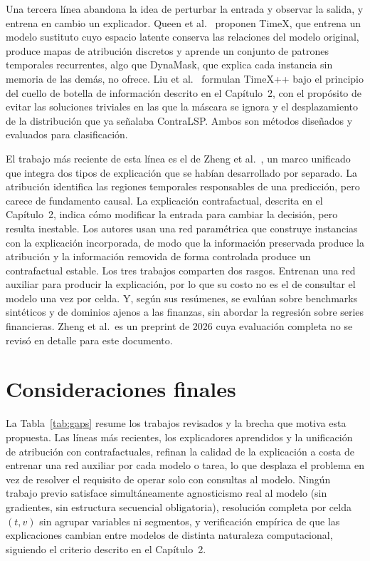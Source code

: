 Una tercera línea abandona la idea de perturbar la entrada y observar la salida, y entrena en cambio un explicador. Queen et al.\ \cite{queen2023timex} proponen TimeX, que entrena un modelo sustituto cuyo espacio latente conserva las relaciones del modelo original, produce mapas de atribución discretos y aprende un conjunto de patrones temporales recurrentes, algo que DynaMask, que explica cada instancia sin memoria de las demás, no ofrece. Liu et al.\ \cite{liu2024timexpp} formulan TimeX++ bajo el principio del cuello de botella de información descrito en el Capítulo~2, con el propósito de evitar las soluciones triviales en las que la máscara se ignora y el desplazamiento de la distribución que ya señalaba ContraLSP. Ambos son métodos diseñados y evaluados para clasificación.

El trabajo más reciente de esta línea es el de Zheng et al.\ \cite{zheng2026unifiedib}, un marco unificado que integra dos tipos de explicación que se habían desarrollado por separado. La atribución identifica las regiones temporales responsables de una predicción, pero carece de fundamento causal. La explicación contrafactual, descrita en el Capítulo~2, indica cómo modificar la entrada para cambiar la decisión, pero resulta inestable. Los autores usan una red paramétrica que construye instancias con la explicación incorporada, de modo que la información preservada produce la atribución y la información removida de forma controlada produce un contrafactual estable. Los tres trabajos comparten dos rasgos. Entrenan una red auxiliar para producir la explicación, por lo que su costo no es el de consultar el modelo una vez por celda. Y, según sus resúmenes, se evalúan sobre benchmarks sintéticos y de dominios ajenos a las finanzas, sin abordar la regresión sobre series financieras. Zheng et al.\ es un preprint de 2026 cuya evaluación completa no se revisó en detalle para este documento.

\section{Consideraciones finales}

La Tabla~\ref{tab:gaps} resume los trabajos revisados y la brecha que motiva esta propuesta. Las líneas más recientes, los explicadores aprendidos y la unificación de atribución con contrafactuales, refinan la calidad de la explicación a costa de entrenar una red auxiliar por cada modelo o tarea, lo que desplaza el problema en vez de resolver el requisito de operar solo con consultas al modelo. Ningún trabajo previo satisface simultáneamente agnosticismo real al modelo (sin gradientes, sin estructura secuencial obligatoria), resolución completa por celda $(t,v)$ sin agrupar variables ni segmentos, y verificación empírica de que las explicaciones cambian entre modelos de distinta naturaleza computacional, siguiendo el criterio descrito en el Capítulo~2.


